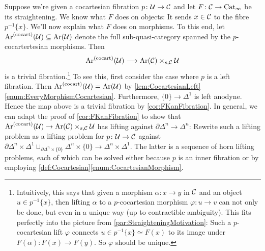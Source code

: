 \begin{numpar}\label{par:StraighteningOnMorphisms}
	Suppose we're given a cocartesian fibration $p\colon \mathcal{U}\rightarrow \mathcal{C}$ and let $F\colon \mathcal{C}\rightarrow \mathrm{Cat}_\infty$ be its straightening. We know what $F$ does on objects: It sends $x\in \mathcal{C}$ to the fibre $p^{-1}\{x\}$. We'll now explain what $F$ does on morphisms. To this end, let $\operatorname{Ar}^{(\mathrm{cocart})}(\mathcal{U})\subseteq \operatorname{Ar}(\mathcal{U})$ denote the full sub-quasi-category spanned by the $p$-cocartertesian morphisms. Then 
	\begin{equation*}
		\operatorname{Ar}^{(\mathrm{cocart})}(\mathcal{U})\longrightarrow \operatorname{Ar}(\mathcal{C})\times_{s,\mathcal{C}}\mathcal{U}
	\end{equation*}
	is a trivial fibration.\footnote{Intuitively, this says that given a morphism $\alpha\colon x\rightarrow y$ in $\mathcal{C}$ and an object $u\in p^{-1}\{x\}$, then lifting $\alpha$ to a $p$-cocartesian morphism $\varphi\colon u\rightarrow v$ can not only be done, but even in a unique way (up to contractible ambiguity). This fits perfectly into the picture from \cref{par:StraighteningMotivation}: Such a $p$-cocartesian lift $\varphi$ connects $u\in p^{-1}\{x\}\simeq F(x)$ to its image under $F(\alpha)\colon F(x)\rightarrow F(y)$. So $\varphi$ should be unique.} To see this, first consider the case where $p$ is a left fibration. Then $\operatorname{Ar}^{(\mathrm{cocart})}(\mathcal{U})= \operatorname{Ar}(\mathcal{U})$ by \cref{lem:CocartesianLeft}\cref{enum:EveryMorphismCocartesian}. Furthermore, $\{0\}\rightarrow \Delta^1$ is left anodyne. Hence the map above is a trivial fibration by \cref{cor:FKanFibration}. In general, we can adapt the proof of \cref{cor:FKanFibration} to show that $\operatorname{Ar}^{(\mathrm{cocart})}(\mathcal{U})\rightarrow \operatorname{Ar}(\mathcal{C})\times_{s,\mathcal{C}}\mathcal{U}$ has lifting against $\partial\Delta^n\rightarrow\Delta^n$: Rewrite such a lifting problem as a lifting problem for $p\colon \mathcal{U}\rightarrow \mathcal{C}$ against $\partial\Delta^n\times\Delta^1\sqcup_{\partial\Delta^n\times\{0\}}\Delta^n\times\{0\}\rightarrow \Delta^n\times\Delta^1$. The latter is a sequence of horn lifting problems, each of which can be solved either because $p$ is an inner fibration or by employing \cref{def:Cocartesian}\cref{enum:CocartesianMorphism}.%
	

\end{numpar}
